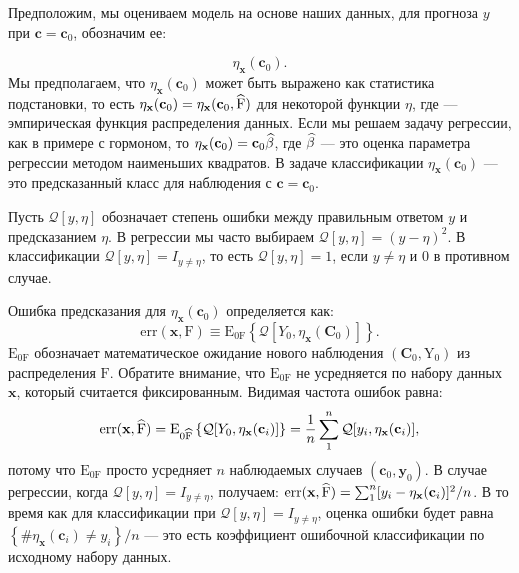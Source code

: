 Предположим, мы оцениваем модель на основе наших данных, для прогноза $y$ при $\textbf{c} = \textbf{c}_{0}$, обозначим ее:

\begin{equation}
\eta_{\textbf{x}}(\textbf{c}_{0}).
\end{equation}
Мы предполагаем, что $\eta_{\textbf{x}}(\textbf{c}_{0})$ может быть выражено как статистика подстановки, то есть  $\eta_{\textbf{x}}(\textbf{c}_{0}) = \eta_{\textbf{x}}(\textbf{c}_{0}, \widehat{\text{F}})$ для некоторой функции $\eta$, где  --- эмпирическая функция распределения данных. Если мы решаем задачу регрессии, как в примере с гормоном, то $\eta_{\textbf{x}}(\textbf{c}_{0}) = \textbf{c}_{0} \widehat{\beta}$, где $\widehat{\beta}$ --- это оценка параметра регрессии методом наименьших квадратов. В задаче классификации $\eta_{\textbf{x}}(\textbf{c}_{0})$ --- это предсказанный класс для наблюдения с $\textbf{c} = \textbf{c}_{0}$.

Пусть $\mathcal{Q}[y, \eta]$ обозначает степень ошибки между правильным ответом $y$ и предсказанием $\eta$. В регрессии мы часто выбираем $\mathcal{Q}[y, \eta] = (y - \eta)^{2}$. В классификации $\mathcal{Q}[y, \eta] = I_{y \neq \eta}$, то есть $\mathcal{Q}[y, \eta] = 1$, если $y \neq \eta$ и $0$ в противном случае.

Ошибка предсказания для $\eta_{\textbf{x}}(\textbf{c}_{0})$ определяется как:
\begin{equation}
\text{err}(\textbf{x}, \text{F}) \equiv \mathrm{E}_{0\text{F}} \left \{ \mathcal{Q}[Y_{0}, \eta_{\textbf{x}}(\textbf{C}_{0})] \right \}.
\end{equation}
$\mathrm{E}_{0\text{F}}$ обозначает математическое ожидание нового наблюдения $(\textbf{C}_{0}, \text{Y}_{0})$ из распределения $\text{F}$. Обратите внимание, что $\mathrm{E}_{0\text{F}}$ не усредняется по набору данных $\mathbf{x}$, который считается фиксированным. Видимая частота ошибок равна:
\begin{equation}
\text{err}(\textbf{x}, \widehat{\text{F}}) = \mathrm{E}_{0\widehat{\text{F}}} \left \{ \mathcal{Q}[Y_{0}, \eta_{\textbf{x}}(\textbf{c}_{i})] \right \} = \frac{1}{n} \sum_{1}^{n}  \mathcal{Q}[y_{i}, \eta_{\textbf{x}}(\textbf{c}_{i})],
\end{equation}
потому что $\mathrm{E}_{0\text{F}}$ просто усредняет $n$ наблюдаемых случаев $(\textbf{c}_{0}, \textbf{y}_{0})$. В случае регрессии, когда $\mathcal{Q}[y, \eta] = I_{y \neq \eta}$,  получаем: $ \text{err}(\textbf{x}, \widehat{\text{F}}) = \sum_{1}^{n} [y_{i} - \eta_{\mathbf{x}}(\mathbf{c}_{i})]^{2} / n $. В то время как для классификации при $\mathcal{Q}[y, \eta] = I_{y \neq \eta}$, оценка ошибки будет равна $ \left \{ \#{\eta_{\textbf{x}}(\textbf{c}_{i}) \neq y_{i}}\right \}/n$ --- это есть коэффициент ошибочной классификации по исходному набору данных.

